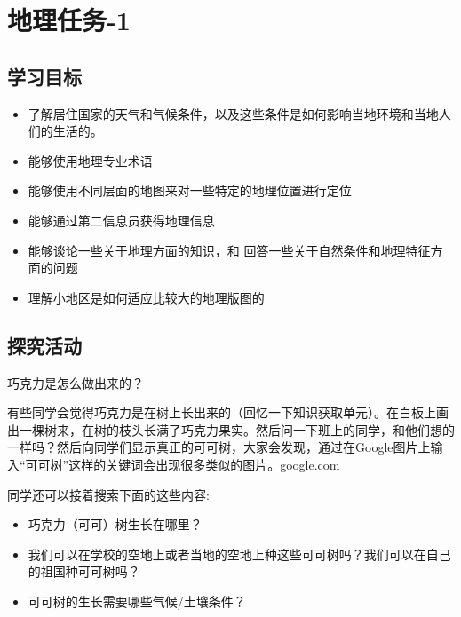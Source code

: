 \chapter{地理任务-1}



\section{学习目标}
    \begin{itemize}
      \item 了解居住国家的天气和气候条件，以及这些条件是如何影响当地环境和当地人们的生活的。
      \item 能够使用地理专业术语
      \item 能够使用不同层面的地图来对一些特定的地理位置进行定位
      \item 能够通过第二信息员获得地理信息
      \item 能够谈论一些关于地理方面的知识，和 回答一些关于自然条件和地理特征方面的问题
      \item 理解小地区是如何适应比较大的地理版图的
    \end{itemize}  


\section{探究活动}
    巧克力是怎么做出来的？\par
    有些同学会觉得巧克力是在树上长出来的（回忆一下知识获取单元）。在白板上画出一棵树来，在树的枝头长满了巧克力果实。然后问一下班上的同学，和他们想的一样吗？然后向同学们显示真正的可可树，大家会发现，通过在Google图片上输入“可可树”这样的关键词会出现很多类似的图片。\href{http://images.google.com/}{google.com}  \par
    同学还可以接着搜索下面的这些内容:\par
    \begin{itemize}
      \item 巧克力（可可）树生长在哪里？
      \item 我们可以在学校的空地上或者当地的空地上种这些可可树吗？我们可以在自己的祖国种可可树吗？
      \item 可可树的生长需要哪些气候/土壤条件？
    \end{itemize}
    
